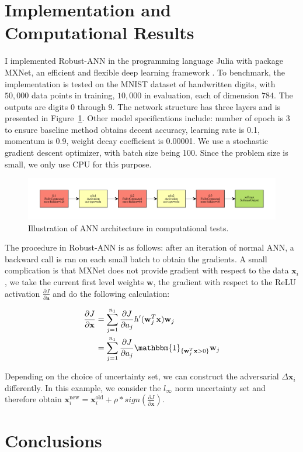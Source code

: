 \documentclass[twoside,12pt]{article}
\newcommand{\M}[1]{\boldsymbol{\mathbf{#1}}}
\begin{document}
\section{Implementation and Computational Results}
I implemented Robust-ANN in the programming language \textsf{Julia} with package \textsf{MXNet}, an efficient and flexible deep learning framework \cite{mxnet}. To benchmark, the implementation is tested on the MNIST dataset of handwritten digits, with $50,000$ data points in training, $10,000$ in evaluation, each of dimension $784$. The outputs are digits $0$ through $9$. The network structure has three layers and is presented in Figure~\ref{fig:ann_arc}. Other model specifications include: number of epoch is 3 to ensure baseline method obtains decent accuracy, learning rate is 0.1, momentum is 0.9, weight decay coefficient is 0.00001. We use a stochastic gradient descent optimizer, with batch size being 100. Since the problem size is small, we only use CPU for this purpose. 
\begin{figure}[ht!]
    \includegraphics[scale=0.7]{visualize.pdf}
    \caption{Illustration of ANN architecture in computational tests.}
    \label{fig:ann_arc}
\end{figure}



The procedure in Robust-ANN is as follows: after an iteration of normal ANN, a backward call is ran on each small batch to obtain the gradients. A small complication is that \textsf{MXNet} does not provide gradient with respect to the data $\M x_i$, we take the current first level weights $\M w$, the gradient with respect to the ReLU activation $\frac{\partial J}{\partial \M a}$ and do the following calculation:


\begin{equation}
\begin{aligned}
\frac{\partial J}{\partial \M x} 
& = \sum_{j=1}^{n_1} \frac{\partial J}{\partial a_j} h'(\M w_j^T \M x) \M w_j\\
& = \sum_{j=1}^{n_1} \frac{\partial J}{\partial a_j} \mathbbm{1}_{\{\M w_j^T \M x > 0 \} } \M w_j
\end{aligned}
\end{equation}

Depending on the choice of uncertainty set, we can construct the adversarial $\Delta \M x_i$ differently. In this example, we consider the $l_\infty$ norm uncertainty set and therefore obtain $\M x_i^{\textrm{new}} = \M x_i^{\textrm{old}} + \rho * sign(\frac{\partial J}{\partial \M x})$.

\section{Conclusions}




\end{document}
